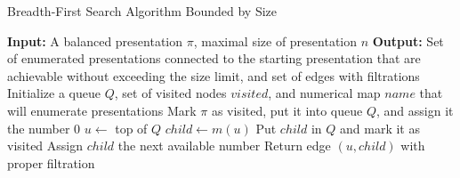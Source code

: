 \begin{algorithm}
	\caption{Breadth-First Search Algorithm Bounded by Size}
	\label{alg:bfs_1}
	\begin{algorithmic}[1]
		\State \textbf{Input:} A balanced presentation $\pi$, maximal size of presentation $n$
		\State \textbf{Output:} Set of enumerated presentations connected to the starting presentation that are achievable without exceeding the size limit, and set of edges with filtrations
		\State Initialize a queue $Q$, set of visited nodes $visited$, and numerical map $name$ that will enumerate presentations
		\State Mark $\pi$ as visited, put it into queue $Q$, and assign it the number $0$
		\State $u \gets $ top of $Q$ 
		\State $child \gets m(u)$
		\State Put $child$ in $Q$ and mark it as visited
		\State Assign $child$ the next available number
		\EndIf
		\State Return edge $(u, child)$ with proper filtration
		\EndIf
		\EndFor
		\EndWhile
	\end{algorithmic}
\end{algorithm}